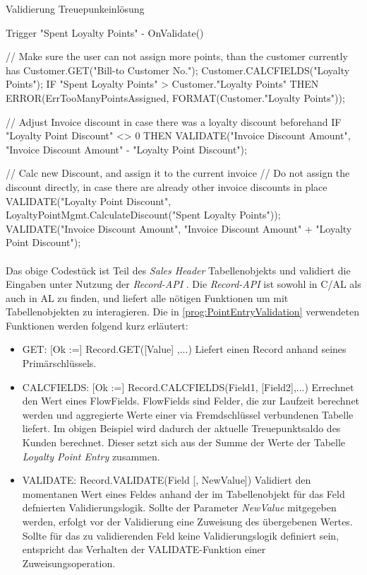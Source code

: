 \pagebreak

\begin{program}  %
	\caption{Validierung Treuepunkeinlösung}
	\label{prog:PointEntryValidation}
	\begin{JavaCode}
Trigger "Spent Loyalty Points" - OnValidate()

// Make sure the user can not assign more points, than the customer currently has
Customer.GET("Bill-to Customer No.");
Customer.CALCFIELDS("Loyalty Points");
IF "Spent Loyalty Points" > Customer."Loyalty Points" THEN
  ERROR(ErrTooManyPointsAssigned, FORMAT(Customer."Loyalty Points"));

// Adjust Invoice discount in case there was a loyalty discount beforehand
IF "Loyalty Point Discount" <> 0 THEN
  VALIDATE("Invoice Discount Amount", 
           "Invoice Discount Amount" - "Loyalty Point Discount");

// Calc new Discount, and assign it to the current invoice
// Do not assign the discount directly, in case there are already other invoice discounts in place
VALIDATE("Loyalty Point Discount", 
         LoyaltyPointMgmt.CalculateDiscount("Spent Loyalty Points"));
VALIDATE("Invoice Discount Amount", 
         "Invoice Discount Amount" + "Loyalty Point Discount");
	\end{JavaCode}
\end{program}

\paragraph{}
Das obige Codestück ist Teil des \textit{Sales Header} Tabellenobjekts und validiert die Eingaben unter Nutzung der \textit{Record-API} \cite{msdnRecordAPI}. Die \textit{Record-API} ist sowohl in C/AL als auch in AL zu finden, und liefert alle nötigen Funktionen um mit Tabellenobjekten zu interagieren. Die in \ref{prog:PointEntryValidation} verwendeten Funktionen werden folgend kurz erläutert: 
\begin{itemize}
	\item GET: [Ok :=] Record.GET([Value] ,...) Liefert einen Record anhand seines Primärschlüssels.
	\item CALCFIELDS: [Ok :=] Record.CALCFIELDS(Field1, [Field2],...) Errechnet den Wert eines FlowFields. FlowFields sind Felder, die zur Laufzeit berechnet werden und aggregierte Werte einer via Fremdschlüssel verbundenen Tabelle liefert. Im obigen Beispiel wird dadurch der aktuelle Treuepunktsaldo des Kunden berechnet. Dieser setzt sich aus der Summe der Werte der Tabelle \textit{Loyalty Point Entry} zusammen.
	\item VALIDATE: Record.VALIDATE(Field [, NewValue]) Validiert den momentanen Wert eines Feldes anhand der im Tabellenobjekt für das Feld defnierten Validierungslogik. Sollte der Parameter \textit{NewValue} mitgegeben werden, erfolgt vor der Validierung eine Zuweisung des übergebenen Wertes. Sollte für das zu validierenden Feld keine Validierungslogik definiert sein, entspricht das Verhalten der VALIDATE-Funktion einer Zuweisungsoperation.
\end{itemize}

